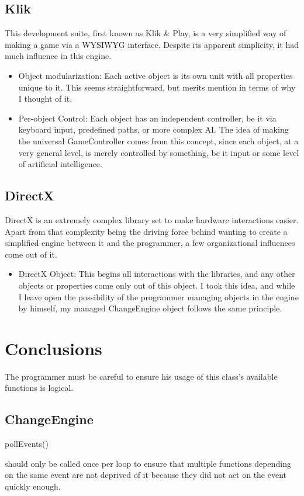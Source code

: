 \documentclass[12pt]{article}
\begin{document}
\subsection{Klik}
This development suite, first known as Klik \& Play, is a very simplified way of making a game via a WYSIWYG interface. Despite its apparent simplicity, it had much influence in this engine.

\begin{itemize}
 \item Object modularization: Each active object is its own unit with all properties unique to it. This seems straightforward, but merits mention in terms of why I thought of it.
 \item Per-object Control: Each object has an independent controller, be it via keyboard input, predefined paths, or more complex AI. The idea of making the universal GameController comes from this concept, since each object, at a very general level, is merely controlled by something, be it input or some level of artificial intelligence.
\end{itemize}

\subsection{DirectX}
DirectX is an extremely complex library set to make hardware interactions easier. Apart from that complexity being the driving force behind wanting to create a simplified engine between it and the programmer, a few organizational influences come out of it.

\begin{itemize}
 \item DirectX Object: This begins all interactions with the libraries, and any other objects or properties come only out of this object. I took this idea, and while I leave open the possibility of the programmer managing objects in the engine by himself, my managed ChangeEngine object follows the same principle.
\end{itemize}


  \section{Conclusions}
    The programmer must be careful to ensure his usage of this class's available functions is logical.
\subsection{ChangeEngine}
\begin{verbatim*}pollEvents()\end{verbatim*} should only be called once per loop to ensure that multiple functions depending on the same event are not deprived of it because they did not act on the event quickly enough.
\\
\end{document}

